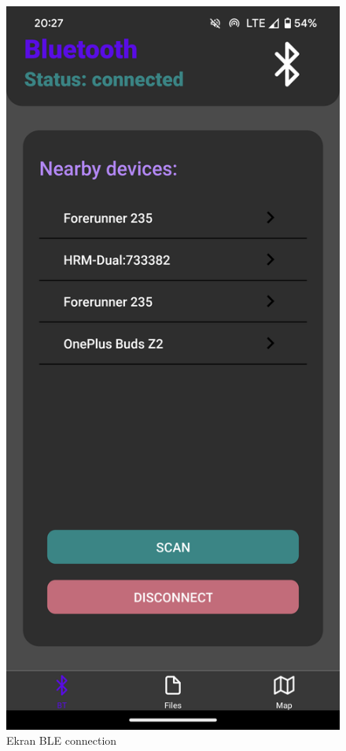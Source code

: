 \begin{figure}[H]
    \centering
    \includegraphics[scale = 0.07]{res/BT.png}
    \caption{Ekran BLE connection}
\end{figure}


